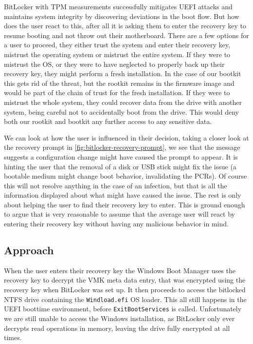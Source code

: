 BitLocker with \ac{TPM} measurements successfully mitigates \ac{UEFI} attacks and maintains system integrity by discovering deviations in the boot flow.
But how does the user react to this, after all it is asking them to enter the recovery key to resume booting and not throw out their motherboard.
There are a few options for a user to proceed, they either trust the system and enter their recovery key, mistrust the operating system or mistrust the entire system.
If they were to mistrust the \ac{OS}, or they were to have neglected to properly back up their recovery key, they might perform a fresh installation.
In the case of our bootkit this gets rid of the threat, but the rootkit remains in the firmware image and would be part of the chain of trust for the fresh installation.
If they were to mistrust the whole system, they could recover data from the drive with another system, being careful not to accidentally boot from the drive.
This would deny both our rootkit and bootkit any further access to any sensitive data.

We can look at how the user is influenced in their decision, taking a closer look at the recovery prompt in \autoref{fig:bitlocker-recovery-prompt}, we see that the message suggests a configuration change might have caused the prompt to appear. It is hinting the user that the removal of a disk or \ac{USB} stick might fix the issue (a bootable medium might change boot behavior, invalidating the \acp{PCR}). Of course this will not resolve anything in the case of an infection, but that is all the information displayed about what might have caused the issue. The rest is only about helping the user to find their recovery key to enter.
This is ground enough to argue that is very reasonable to assume that the average user will react by entering their recovery key without having any malicious behavior in mind.


\subsection{Approach}

When the user enters their recovery key the Windows Boot Manager uses the recovery key to decrypt the \ac{VMK} meta data entry, that was encrypted using the recovery key when BitLocker was set up.
It then proceeds to access the bitlocked \ac{NTFS} drive containing the \lstinline{Windload.efi} \ac{OS} loader.
This all still happens in the \ac{UEFI} boottime environment, before \lstinline{ExitBootServices} is called.
Unfortunately we are still unable to access the Windows installation, as BitLocker only ever decrypts read operations in memory, leaving the drive fully encrypted at all times.

